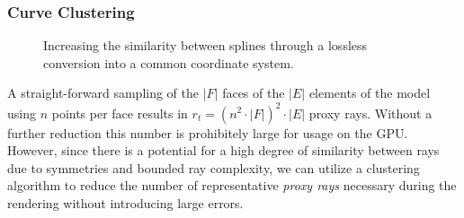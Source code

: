 \subsubsection{Curve Clustering} \label{contributions:fem:curves}
\begin{figure}
\centering
{}
\caption{Increasing the similarity between splines through a lossless conversion into a common coordinate system.}
\label{contributions:fem:splines}
\end{figure}



A straight-forward sampling of the $|F|$ faces of the $|E|$ elements of the model using $n$ points per face results in $r_t = \left( n^2 \cdot |F| \right) ^2 \cdot |E|$ proxy rays.  Without a further reduction this number is prohibitely large for usage on the GPU.  However, since there is a potential for a high degree of similarity between rays due to symmetries and bounded ray complexity, we can utilize a clustering algorithm to reduce the number of representative \emph{proxy rays} necessary during the rendering without introducing large errors.


